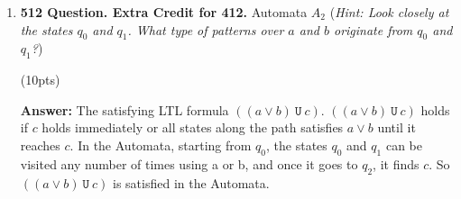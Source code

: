 \documentclass[11pt]{article}
\newcommand{\lu}[2]{(#1\ \texttt{U}\ #2)}
\begin{document}
\begin{enumerate}
\begin{enumerate}
    
  \item \textbf{512 Question. Extra Credit for 412.}  Automata $A_2$
  (\emph{Hint: Look closely at the states $q_0$ and $q_1$. What
  type of patterns over $a$ and $b$ originate from $q_0$ and $q_1$?})
    \begin{center}
        \end{center}
\hfill(10pts)

     \textbf{Answer:} The satisfying LTL formula $\lu{(a \lor b)}{c}$. $\lu{(a \lor b)}{c}$ holds if $c$ holds immediately or all states along the path satisfies $a \lor b$ until it reaches $c$. In the Automata, starting from $q_0$, the states $q_0$ and $q_1$ can be visited any number of times using a or b, and once it goes to $q_2$, it finds $c$. So $\lu{(a \lor b)}{c}$ is satisfied in the Automata. 

     
    \end{enumerate}




\end{enumerate}
\end{document}
